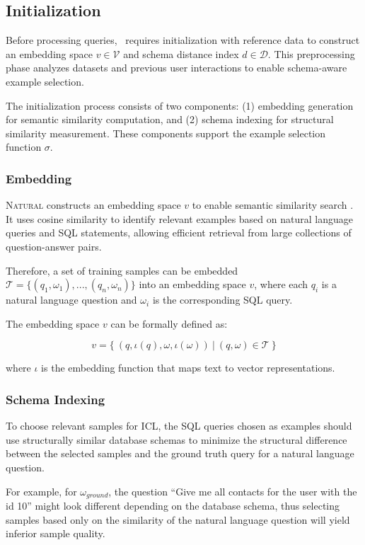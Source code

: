 \subsection{Initialization}

Before processing queries, \Natural~requires initialization with reference
data to construct an embedding space $v \in \mathcal{V}$ and schema distance
index $d \in \mathcal{D}$. This preprocessing phase analyzes datasets and
previous user interactions to enable schema-aware example selection.

The initialization process consists of two components: (1) embedding generation
for semantic similarity computation, and (2) schema indexing for structural
similarity measurement. These components support the example selection function
$\sigma$.

\subsubsection{Embedding}\label{design:embedding}

\textsc{Natural} constructs an embedding space $v$ to enable semantic
similarity search \citep{DAIL-SQL}. It uses cosine similarity to identify
relevant examples based on natural language queries and SQL statements,
allowing efficient retrieval from large collections of question-answer pairs.

Therefore, a set of training samples can be embedded $\mathcal{T} = \{(q_1,
\omega_1), ..., (q_n, \omega_n)\}$ into an embedding space $v$, where each
$q_i$ is a natural language question and $\omega_i$ is the corresponding SQL
query.

The embedding space $v$ can be formally defined as:

$$v = \{~(q, \iota(q), \omega, \iota(\omega))~|~(q, \omega) \in \mathcal{T}~\}$$

where $\iota$ is the embedding function that maps text to vector representations.

\subsubsection{Schema Indexing}

To choose relevant samples for ICL, the SQL queries chosen as examples should
use structurally similar database schemas to minimize the structural difference
between the selected samples and the ground truth query for a natural language
question.

For example, for $\omega_{ground}$, the question ``Give me all contacts for the user
with the id 10'' might look different depending on the database schema, thus
selecting samples based only on the similarity of the natural language question
will yield inferior sample quality.

